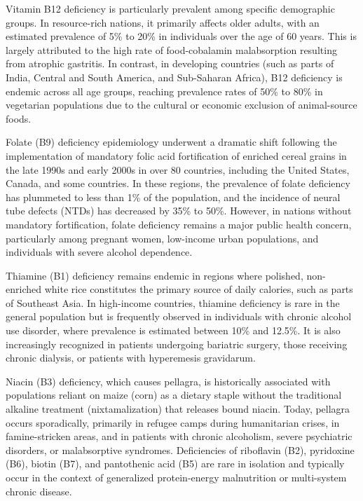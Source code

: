 Vitamin B12 deficiency is particularly prevalent among specific demographic groups. In resource-rich nations, it primarily affects older adults, with an estimated prevalence of 5\% to 20\% in individuals over the age of 60 years. This is largely attributed to the high rate of food-cobalamin malabsorption resulting from atrophic gastritis. In contrast, in developing countries (such as parts of India, Central and South America, and Sub-Saharan Africa), B12 deficiency is endemic across all age groups, reaching prevalence rates of 50\% to 80\% in vegetarian populations due to the cultural or economic exclusion of animal-source foods.

Folate (B9) deficiency epidemiology underwent a dramatic shift following the implementation of mandatory folic acid fortification of enriched cereal grains in the late 1990s and early 2000s in over 80 countries, including the United States, Canada, and some countries. In these regions, the prevalence of folate deficiency has plummeted to less than 1\% of the population, and the incidence of neural tube defects (NTDs) has decreased by 35\% to 50\%. However, in nations without mandatory fortification, folate deficiency remains a major public health concern, particularly among pregnant women, low-income urban populations, and individuals with severe alcohol dependence.

Thiamine (B1) deficiency remains endemic in regions where polished, non-enriched white rice constitutes the primary source of daily calories, such as parts of Southeast Asia. In high-income countries, thiamine deficiency is rare in the general population but is frequently observed in individuals with chronic alcohol use disorder, where prevalence is estimated between 10\% and 12.5\%. It is also increasingly recognized in patients undergoing bariatric surgery, those receiving chronic dialysis, or patients with hyperemesis gravidarum.

Niacin (B3) deficiency, which causes pellagra, is historically associated with populations reliant on maize (corn) as a dietary staple without the traditional alkaline treatment (nixtamalization) that releases bound niacin. Today, pellagra occurs sporadically, primarily in refugee camps during humanitarian crises, in famine-stricken areas, and in patients with chronic alcoholism, severe psychiatric disorders, or malabsorptive syndromes. Deficiencies of riboflavin (B2), pyridoxine (B6), biotin (B7), and pantothenic acid (B5) are rare in isolation and typically occur in the context of generalized protein-energy malnutrition or multi-system chronic disease.

